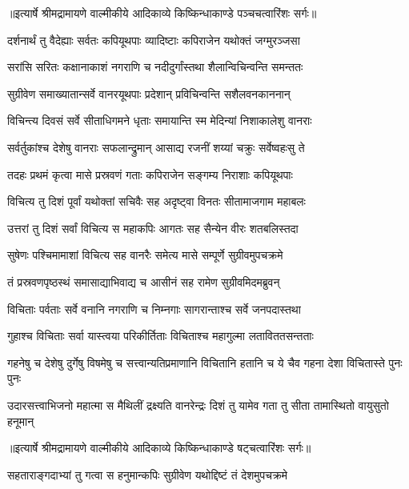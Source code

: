 {॥इत्यार्षे श्रीमद्रामायणे वाल्मीकीये आदिकाव्ये किष्किन्धाकाण्डे पञ्चचत्वारिंशः सर्गः॥}


\twolineshloka
{दर्शनार्थं तु वैदेह्याः सर्वतः कपियूथपाः}
{व्यादिष्टाः कपिराजेन यथोक्तं जग्मुरञ्जसा} %

\twolineshloka
{सरांसि सरितः कक्षानाकाशं नगराणि च}
{नदीदुर्गांस्तथा शैलान्विचिन्वन्ति समन्ततः} %

\twolineshloka
{सुग्रीवेण समाख्यातान्सर्वे वानरयूथपाः}
{प्रदेशान् प्रविचिन्वन्ति सशैलवनकाननान्} %

\twolineshloka
{विचिन्त्य दिवसं सर्वे सीताधिगमने धृताः}
{समायान्ति स्म मेदिन्यां निशाकालेशु वानराः} %

\twolineshloka
{सर्वर्तुकांश्च देशेषु वानराः सफलान्द्रुमान्}
{आसाद्य रजनीं शय्यां चक्रुः सर्वेष्वहःसु ते} %

\twolineshloka
{तदहः प्रथमं कृत्वा मासे प्रस्रवणं गताः}
{कपिराजेन सङ्गम्य निराशाः कपियूथपाः} %

\twolineshloka
{विचित्य तु दिशं पूर्वां यथोक्तां सचिवैः सह}
{अदृष्ट्वा विनतः सीतामाजगाम महाबलः} %

\twolineshloka
{उत्तरां तु दिशं सर्वां विचित्य स महाकपिः}
{आगतः सह सैन्येन वीरः शतबलिस्तदा} %

\twolineshloka
{सुषेणः पश्चिमामाशां विचित्य सह वानरैः}
{समेत्य मासे सम्पूर्णे सुग्रीवमुपचक्रमे} %

\twolineshloka
{तं प्रस्रवणपृष्ठस्थं समासाद्याभिवाद्य च}
{आसीनं सह रामेण सुग्रीवमिदमब्रुवन्} %

\twolineshloka
{विचिताः पर्वताः सर्वे वनानि नगराणि च}
{निम्नगाः सागरान्ताश्च सर्वे जनपदास्तथा} %

\twolineshloka
{गुहाश्च विचिताः सर्वा यास्त्वया परिकीर्तिताः}
{विचिताश्च महागुल्मा लताविततसन्तताः} %

\threelineshloka
{गहनेषु च देशेषु दुर्गेषु विषमेषु च}
{सत्त्वान्यतिप्रमाणानि विचितानि हतानि च}
{ये चैव गहना देशा विचितास्ते पुनः पुनः} %

\fourlineindentedshloka
{उदारसत्त्वाभिजनो महात्मा}
{स मैथिलीं द्रक्ष्यति वानरेन्द्रः}
{दिशं तु यामेव गता तु सीता}
{तामास्थितो वायुसुतो हनूमान्} %


{॥इत्यार्षे श्रीमद्रामायणे वाल्मीकीये आदिकाव्ये किष्किन्धाकाण्डे षट्चत्वारिंशः सर्गः॥}


\twolineshloka
{सहताराङ्गदाभ्यां तु गत्वा स हनुमान्कपिः}
{सुग्रीवेण यथोद्दिष्टं तं देशमुपचक्रमे} %

